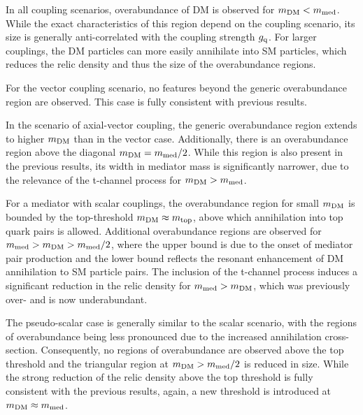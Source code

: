 In all coupling scenarios, overabundance of DM is observed for $m_{\rm DM}<m_{\rm med}$. While the exact characteristics of this region depend on the coupling scenario, its size is generally anti-correlated with the coupling strength $g_{\rm q}$. For larger couplings, the DM particles can more easily annihilate into SM particles, which reduces the relic density and thus the size of the overabundance regions.

For the vector coupling scenario, no features beyond the generic overabundance region are observed. This case is fully consistent with previous results.

In the scenario of axial-vector coupling, the generic overabundance region extends to higher $m_{\rm DM}$ than in the vector case. Additionally, there is an overabundance region above the diagonal $m_{\rm DM}=m_{\rm med}/2$. While this region is also present in the previous results, its width in mediator mass is significantly narrower, due to the relevance of the t-channel process for $m_{\rm DM}>m_{\rm med}$. 

For a mediator with scalar couplings, the overabundance region for small $m_{\rm DM}$ is bounded by the top-threshold $m_{\rm DM}\approx m_{\rm top}$, above which annihilation into top quark pairs is allowed. Additional overabundance regions are observed for $m_{\rm med} > m_{\rm DM} > m_{\rm med}/2$, where the upper bound is due to the onset of mediator pair production and the lower bound reflects the resonant enhancement of DM annihilation to SM particle pairs. The inclusion of the t-channel process induces a significant reduction in the relic density for $m_{\rm med} > m_{\rm DM}$, which was previously over- and is now underabundant.

The pseudo-scalar case is generally similar to the scalar scenario, with the regions of overabundance being less pronounced due to the increased annihilation cross-section. Consequently, no regions of overabundance are observed above the top threshold and the triangular region at $m_{\rm DM} > m_{\rm med}/2$ is reduced in size. While the strong reduction of the relic density above the top threshold is fully consistent with the previous results, again, a new threshold is introduced at $m_{\rm DM} \approx m_{\rm med}$.

